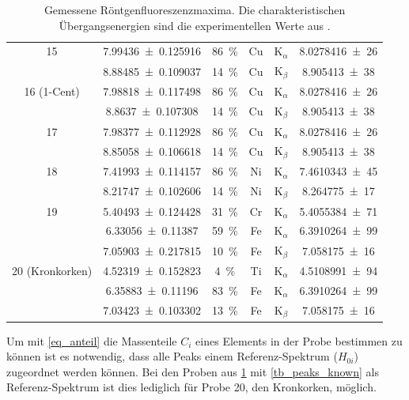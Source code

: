 \documentclass[
	a4paper,
	12pt,
	pagesize,
	ngerman
]{scrartcl}
\begin{document}
\begin{table}[H]
{\begin{tabular}{ c | c | c || c | c | c }
			15 
			& \SI{7.99436+-0.125916}{} &\SI{86}{\%}& Cu & $\text{K}_\alpha$ &  \SI{8,0278416(26)}{} \\
			& \SI{8.88485+-0.109037}{} &\SI{14}{\%}&  Cu &  $\text{K}_\beta$ & \SI{8,905413(38)}{} \\ 
			\hline
			
			16 (1-Cent)
			& \SI{7.98818+-0.117498}{} &\SI{86}{\%}& Cu & $\text{K}_\alpha$ &  \SI{8,0278416(26)}{} \\
			& \SI{8.8637+-0.107308}{} &\SI{14}{\%}& Cu &  $\text{K}_\beta$ & \SI{8,905413(38)}{} \\ 
			\hline
			
			17 
			& \SI{7.98377+-0.112928}{} &\SI{86}{\%}& Cu & $\text{K}_\alpha$ & \SI{8,0278416(26)}{} \\
			& \SI{8.85058+-0.106618}{} &\SI{14}{\%}& Cu & $\text{K}_\beta$ & \SI{8,905413(38)}{} \\ 
			\hline
			
			18 
			& \SI{7.41993+-0.114157}{} &\SI{86}{\%}& Ni & $\text{K}_\alpha$ & \SI{7,4610343(45)}{} \\
			& \SI{8.21747+-0.102606}{} &\SI{14}{\%}& Ni & $\text{K}_\beta$ &   \SI{8,264775(17)}{} \\ 
			\hline
			
			19 
			& \SI{5.40493+-0.124428}{} &\SI{31}{\%}& Cr & $\text{K}_\alpha$ & \SI{5,4055384(71)}{} \\
			& \SI{6.33056+-0.11387}{} &\SI{59}{\%}& Fe & $\text{K}_\alpha$ & \SI{ 6,3910264(99)}{} \\
			& \SI{7.05903+-0.217815}{} &\SI{10}{\%}& Fe &  $\text{K}_\beta $ & \SI{7,058175(16)}{} \\ 
			\hline
			
			20 (Kronkorken) 
			& \SI{4.52319+-0.152823}{} &\SI{4}{\%}& Ti & $\text{K}_\alpha $ &  \SI{4. 5108991(94)}{} \\ 
			& \SI{6.35883+-0.11196}{} &\SI{83}{\%}& Fe & $\text{K}_\alpha $ &  \SI{6,3910264(99)}{} \\
			& \SI{7.03423+-0.103302}{} &\SI{13}{\%}& Fe & $\text{K}_\beta $ &  \SI{7,058175(16)}{} \\ 
			\hline
		\end{tabular}
		}
		\caption{Gemessene Röntgenfluoreszenzmaxima. Die charakteristischen Übergangsenergien sind die experimentellen Werte aus \cite{XRAYDB}.}
		\label{tb_peaks_unknown}
		
	\end{table}

	Um mit \cref{eq_anteil} die Massenteile $C_i$ eines Elements in der Probe bestimmen zu können ist es notwendig, dass alle Peaks einem Referenz-Spektrum ($H_{0i}$) zugeordnet werden können.
	Bei den Proben aus \cref{tb_peaks_unknown} mit \cref{tb_peaks_known} als Referenz-Spektrum ist dies lediglich für Probe 20, den Kronkorken, möglich.
	
\end{document}
